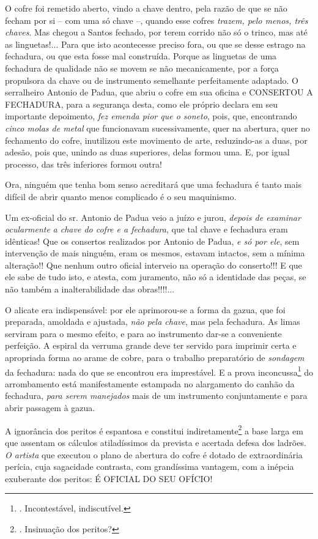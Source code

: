 O cofre foi remetido aberto, vindo a chave dentro, pela razão de que se
não fecham por si -- com uma só chave --, quando esse cofres
\emph{trazem, pelo menos, três chaves}. Mas chegou a Santos fechado, por
terem corrido não só o trinco, mas até as linguetas!... Para que isto
acontecesse preciso fora, ou que se desse estrago na fechadura, ou que
esta fosse mal construída. Porque as linguetas de uma fechadura de
qualidade não se movem se não mecanicamente, por a força propulsora da
chave ou de instrumento semelhante perfeitamente adaptado. O serralheiro
Antonio de Padua, que abriu o cofre em sua oficina e CONSERTOU A
FECHADURA, para a segurança desta, como ele próprio declara em seu
importante depoimento, \emph{fez emenda pior que o soneto}, pois, que,
encontrando \emph{cinco molas de metal} que funcionavam sucessivamente,
quer na abertura, quer no fechamento do cofre, inutilizou este movimento
de arte, reduzindo-as a duas, por adesão, pois que, unindo as duas
superiores, delas formou uma. E, por igual processo, das três inferiores
formou outra!

Ora, ninguém que tenha bom senso acreditará que uma fechadura é tanto
mais difícil de abrir quanto menos complicado é o seu maquinismo.

Um ex-oficial do sr. Antonio de Padua veio a juízo e jurou, \emph{depois
de examinar ocularmente} \emph{a chave do cofre e a fechadura}, que tal
chave e fechadura eram idênticas! Que os consertos realizados por
Antonio de Padua, \emph{e só por ele}, sem intervenção de mais ninguém,
eram os mesmos, estavam intactos, sem a mínima alteração!! Que nenhum
outro oficial interveio na operação do conserto!!! E que ele sabe de
tudo isto, e atesta, com juramento, não só a identidade das peças, se
não também a inalterabilidade das obras!!!!...

O alicate era indispensável: por ele aprimorou-se a forma da gazua, que
foi preparada, amoldada e ajustada, \emph{não pela chave}, mas pela
fechadura. As limas serviram para o mesmo efeito, e para ao instrumento
dar-se a conveniente perfeição. A espiral da verruma grande deve ter
servido para imprimir certa e apropriada forma ao arame de cobre, para o
trabalho preparatório de \emph{sondagem} da fechadura: nada do que se
encontrou era imprestável. E a prova inconcussa\footnote{.
  Incontestável, indiscutível.} do arrombamento está manifestamente
estampada no alargamento do canhão da fechadura, \emph{para serem
manejados} mais de um instrumento conjuntamente e para abrir passagem à
gazua.

A ignorância dos peritos é espantosa e constitui indiretamente\footnote{.
  Insinuação dos peritos?} a base larga em que assentam os cálculos
atiladíssimos da prevista e acertada defesa dos ladrões. \emph{O
artista} que executou o plano de abertura do cofre é dotado de
extraordinária perícia, cuja sagacidade contrasta, com grandíssima
vantagem, com a inépcia exuberante dos peritos: É OFICIAL DO SEU OFÍCIO!

